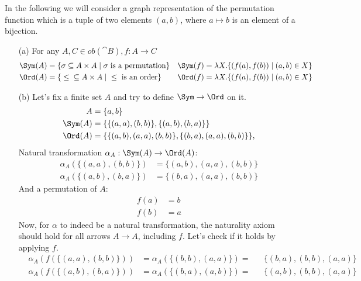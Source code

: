 \begin{answer}
  In the following we will consider a graph representation of the permutation
  function which is a tuple of two elements $(a, b)$, where $a \mapsto b$ is an
  element of a bijection.
  \begin{itemize}
    \item[(a)]
      For any $A,C \in ob(\cat{B}), f: A \to C$
      \begin{align*}
        \Sym(A) &= \{\sigma \subseteq A \times A \mid \sigma \text{ is a permutation} \} & \Sym(f) &= \lambda X. \{(f(a), f(b)) \mid (a, b) \in X \}\\
        \Ord(A) &= \{{}\leq{} \subseteq A \times A \mid {}\leq{} \text{ is an order} \} & \Ord(f) &= \lambda X. \{(f(a), f(b)) \mid (a, b) \in X \}\\
      \end{align*}
    \item[(b)]
      Let's fix a finite set $A$ and try to define $\Sym \to \Ord$ on it.\\
      \begin{align*}
        A &= \{a, b\}\\
        \Sym(A) &= \{\{(a, a), (b, b)\}, \{(a, b), (b, a)\}\}\\
        \Ord(A) &= \{\{(a, b), (a, a), (b, b)\}, \{(b, a), (a, a), (b, b)\}\},\\
      \end{align*}
      Natural transformation $\alpha_A: \Sym(A) \to \Ord(A)$:\\
      \begin{align*}
        \alpha_A(\{(a, a), (b, b)\}) &= \{(a, b), (a, a), (b, b)\}\\
        \alpha_A(\{(a, b), (b, a)\}) &= \{(b, a), (a, a), (b, b)\}
      \end{align*}
      And a permutation of $A$:
      \begin{align*}
        f(a) &= b\\
        f(b) &= a
      \end{align*}
      Now, for $\alpha$ to indeed be a natural transformation, the  naturality
      axiom should hold for all arrows $A \to A$, including $f$. Let's check if
      it holds by applying $f$.\\
      \begin{align*}
        &\alpha_A(f(\{(a, a), (b, b)\})) &= \alpha_A(\{(b, b), (a, a)\}) =&& \{(b, a), (b, b), (a, a)\}\\
        &\alpha_A(f(\{(a, b), (b, a)\})) &= \alpha_A(\{(b, a), (a, b)\}) =&& \{(a, b), (b, b), (a, a)\}

\end{align*}
\end{itemize}
\end{answer}
